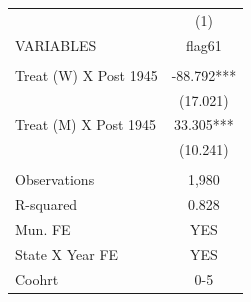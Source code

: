 \begin{tabular}{lc} \hline
 & (1) \\
VARIABLES & flag61 \\ \hline
 &  \\
Treat (W) X Post 1945 & -88.792*** \\
 & (17.021) \\
Treat (M) X Post 1945 & 33.305*** \\
 & (10.241) \\
 &  \\
Observations & 1,980 \\
R-squared & 0.828 \\
Mun. FE & YES \\
State X Year FE & YES \\
 Coohrt & 0-5 \\ \hline
\end{tabular}
